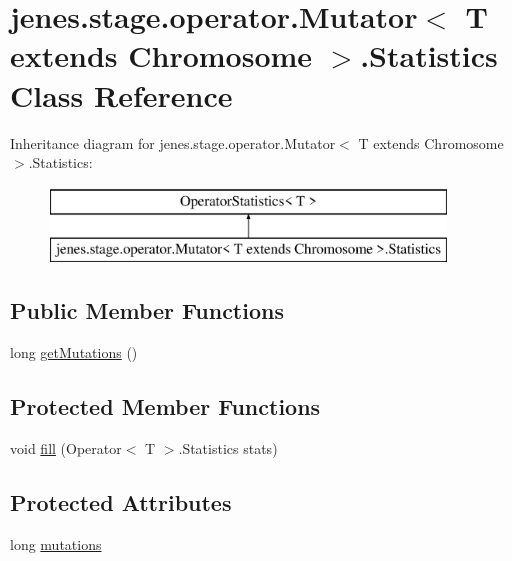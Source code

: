 \hypertarget{classjenes_1_1stage_1_1operator_1_1_mutator_3_01_t_01extends_01_chromosome_01_4_1_1_statistics}{\section{jenes.\-stage.\-operator.\-Mutator$<$ T extends Chromosome $>$.Statistics Class Reference}
\label{classjenes_1_1stage_1_1operator_1_1_mutator_3_01_t_01extends_01_chromosome_01_4_1_1_statistics}
}
Inheritance diagram for jenes.\-stage.\-operator.\-Mutator$<$ T extends Chromosome $>$.Statistics\-:\begin{figure}[H]
\begin{center}
\leavevmode
\includegraphics[height=2.000000cm]{classjenes_1_1stage_1_1operator_1_1_mutator_3_01_t_01extends_01_chromosome_01_4_1_1_statistics}
\end{center}
\end{figure}
\subsection*{Public Member Functions}
\begin{DoxyCompactItemize}
\item 
long \hyperlink{classjenes_1_1stage_1_1operator_1_1_mutator_3_01_t_01extends_01_chromosome_01_4_1_1_statistics_afc74de8d8cf1b0d1cdaf9ec3a170c80e}{get\-Mutations} ()
\end{DoxyCompactItemize}
\subsection*{Protected Member Functions}
\begin{DoxyCompactItemize}
\item 
void \hyperlink{classjenes_1_1stage_1_1operator_1_1_mutator_3_01_t_01extends_01_chromosome_01_4_1_1_statistics_af114cf6ccf66e1bd5d5d7337b4e15e28}{fill} (Operator$<$ T $>$.Statistics stats)
\end{DoxyCompactItemize}
\subsection*{Protected Attributes}
\begin{DoxyCompactItemize}
\item 
long \hyperlink{classjenes_1_1stage_1_1operator_1_1_mutator_3_01_t_01extends_01_chromosome_01_4_1_1_statistics_a4328be89d9643f783f5c08164a0aa916}{mutations}
\end{DoxyCompactItemize}


